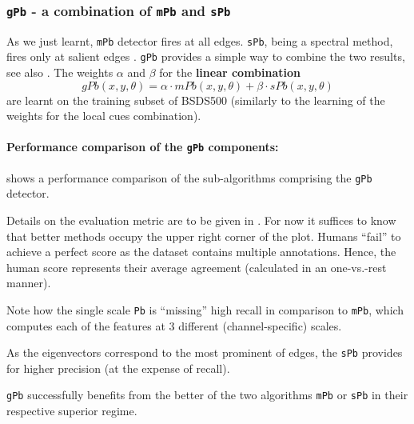 \subsubsection{{\tt gPb} - a combination of {\tt mPb} and {\tt sPb}}
\label{sec:ch3-Pb_mPb_sPb_gPb}
As we just learnt, {\tt mPb} detector fires at all edges. {\tt sPb}, being a spectral method, fires only at salient edges \cite{Fowlkes04,Yu2005segmentation}. {\tt gPb} provides a simple way to combine the two results, see also . The weights $\alpha$ and $\beta$ for the {\bf linear combination} 
\[
 gPb(x,y,\theta)=\alpha \cdot mPb(x,y,\theta) + \beta \cdot sPb(x,y,\theta)
\]
are learnt on the training subset of BSDS500 \cite{BSDS500resources} (similarly to the learning of the weights for the local cues combination). %

\paragraph{Performance comparison of the {\tt gPb} components:} 
\label{par:ch3-Pb_mPb_sPb_gPb}
 shows a performance comparison of the sub-algorithms comprising the {\tt gPb} detector. 

Details on the evaluation metric are to be given in . For now it suffices to know that better methods occupy the upper right corner of the plot. Humans ``fail'' to achieve %
a perfect score as the dataset contains multiple annotations. Hence, the human score represents their average agreement (calculated in an one-vs.-rest manner). 

Note how the single scale {\tt Pb} is ``missing'' high recall in comparison to {\tt mPb}, which computes each of the features at 3 different (channel-specific) scales. 

As the eigenvectors correspond to the most prominent of edges, the {\tt sPb} provides for higher precision (at the expense of recall). 

{\tt gPb} successfully benefits from the better of the two algorithms {\tt mPb} or {\tt sPb} in their respective superior regime.

